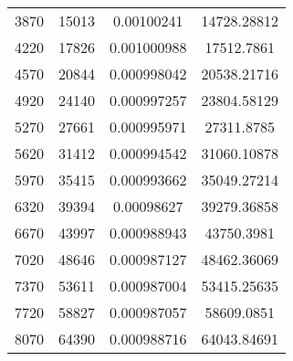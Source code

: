 \documentclass[a4paper,12pt]{article} %
\begin{document}
\begin{table}[H]
{\begin{tabular}{|c|c|c|c|}
			3870                                               & 15013                & 0.00100241               & 14728.28812                                          \\
			4220                                               & 17826                & 0.001000988              & 17512.7861                                           \\
			4570                                               & 20844                & 0.000998042              & 20538.21716                                          \\
			4920                                               & 24140                & 0.000997257              & 23804.58129                                          \\
			5270                                               & 27661                & 0.000995971              & 27311.8785                                           \\
			5620                                               & 31412                & 0.000994542              & 31060.10878                                          \\
			5970                                               & 35415                & 0.000993662              & 35049.27214                                          \\
			6320                                               & 39394                & 0.00098627               & 39279.36858                                          \\
			6670                                               & 43997                & 0.000988943              & 43750.3981                                           \\
			7020                                               & 48646                & 0.000987127              & 48462.36069                                          \\
			7370                                               & 53611                & 0.000987004              & 53415.25635                                          \\
			7720                                               & 58827                & 0.000987057              & 58609.0851                                           \\
			8070                                               & 64390                & 0.000988716              & 64043.84691                                          \\

\end{tabular}}
\end{table}
\end{document}
